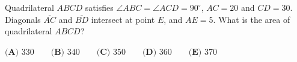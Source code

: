 Quadrilateral $ABCD$ satisfies $\angle ABC=\angle ACD=90^\circ$, $AC=20$ and $CD=30$. Diagonals $\overline{AC}$ and $\overline{BD}$ intersect at point $E$, and $AE=5$. What is the area of quadrilateral $ABCD$?

$\textbf{(A) }330\qquad\textbf{(B) }340\qquad\textbf{(C) }350\qquad\textbf{(D) }360\qquad\textbf{(E) }370$
